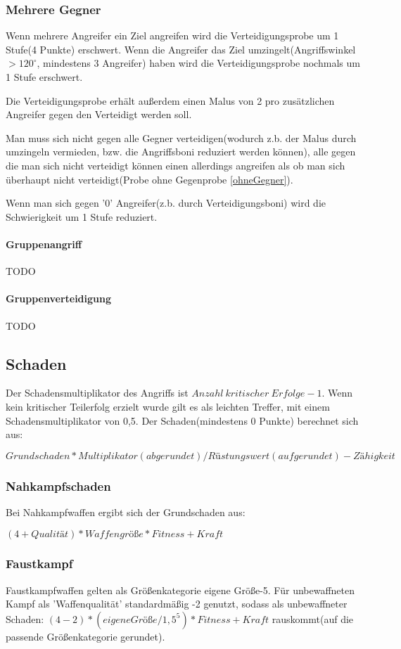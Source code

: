 \subsubsection{Mehrere Gegner}
Wenn mehrere Angreifer ein Ziel angreifen wird die Verteidigungsprobe um 1 Stufe(4 Punkte) erschwert.
Wenn die Angreifer das Ziel umzingelt(Angriffswinkel $>120^\circ$, mindestens 3 Angreifer) haben wird die Verteidigungsprobe nochmals um 1 Stufe erschwert.

Die Verteidigungsprobe erhält außerdem einen Malus von 2 pro zusätzlichen Angreifer gegen den Verteidigt werden soll.

Man muss sich nicht gegen alle Gegner verteidigen(wodurch z.b. der Malus durch umzingeln vermieden, bzw. die Angriffsboni reduziert werden können), alle gegen die man sich nicht verteidigt können einen allerdings angreifen als ob man sich überhaupt nicht verteidigt(Probe ohne Gegenprobe \ref{ohneGegner}).

Wenn man sich gegen '0' Angreifer(z.b. durch Verteidigungsboni) wird die Schwierigkeit um 1 Stufe reduziert.

\paragraph{Gruppenangriff}
TODO
\paragraph{Gruppenverteidigung}
TODO


\subsection{Schaden}
Der Schadensmultiplikator des Angriffs ist $Anzahl\ kritischer\ Erfolge-1$. Wenn kein kritischer Teilerfolg erzielt wurde gilt es als leichten Treffer, mit einem Schadensmultiplikator von 0,5.
Der Schaden(mindestens 0 Punkte) berechnet sich aus:

$Grundschaden*Multiplikator(abgerundet)/Rüstungswert(aufgerundet) - Zähigkeit$
\subsubsection{Nahkampfschaden}
Bei Nahkampfwaffen ergibt sich der Grundschaden aus:

$(4 + Qualität) * Waffengröße * Fitness + Kraft$
\subsubsection{Faustkampf}
Faustkampfwaffen gelten als Größenkategorie eigene Größe-5. Für unbewaffneten Kampf als 'Waffenqualität' standardmäßig -2 genutzt, sodass als unbewaffneter Schaden: $(4-2) * (eigene Größe/1,5^5) * Fitness + Kraft$ rauskommt(auf die passende Größenkategorie gerundet).

